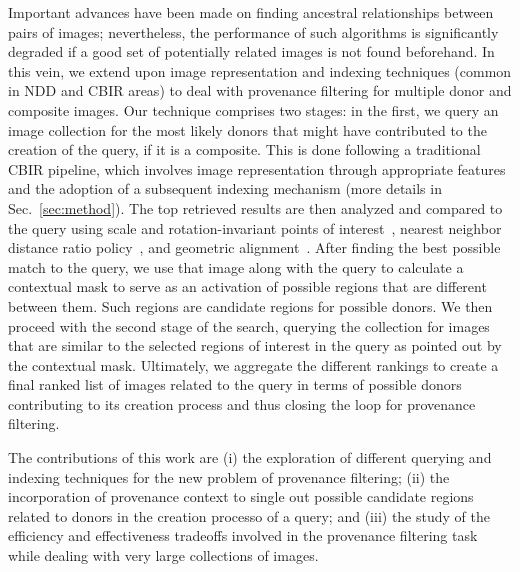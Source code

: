 Important advances have been made on finding ancestral relationships between pairs of images; nevertheless, the performance of such algorithms is significantly degraded if a good set of potentially related images is not found beforehand. In this vein, we extend upon image representation and indexing techniques (common in NDD and CBIR areas) to deal with provenance filtering for multiple donor and composite images. Our technique comprises two stages: in the first, we query an image collection for the most likely donors that might have contributed to the creation of the query, if it is a composite. This is done following a traditional CBIR pipeline, which involves image representation through appropriate features and the adoption of a subsequent indexing mechanism (more details in Sec.~\ref{sec:method}). The top retrieved results are then analyzed and compared to the query using scale and rotation-invariant points of interest~\cite{Bay:CVIU:2008}, nearest neighbor distance ratio policy~\cite{Lowe_1999}, and geometric alignment~\cite{Zitova_2003}. After finding the best possible match to the query, we use that image along with the query to calculate a contextual mask to serve as an activation of possible regions that are different between them. Such regions are candidate regions for possible donors. We then proceed with the second stage of the search, querying the collection for images that are similar to the selected regions of interest in the query as pointed out by the contextual mask. Ultimately, we aggregate the different rankings to create a final ranked list of images related to the query in terms of possible donors contributing to its creation process and thus closing the loop for provenance filtering.

The contributions of this work are (i) the exploration of different querying and indexing techniques for the new problem of provenance filtering; (ii) the incorporation of provenance context to single out possible candidate regions related to donors in the creation processo of a query; and (iii) the study of the efficiency and effectiveness tradeoffs involved in the provenance filtering task while dealing with very large collections of images. 


